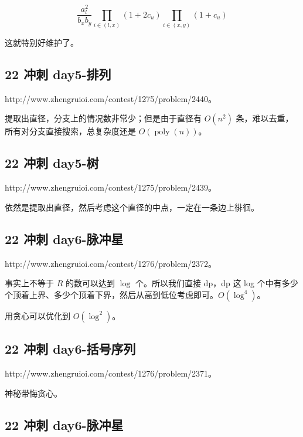 \documentclass[UTF8,12pt,a4paper]{ctexart}
\begin{document}
	$$
	\frac {a_l^2}{b_xb_y}\prod_{i\in(l,x)}(1+2c_u)\prod_{i\in(x,y)} (1+c_u)
	$$
	
	这就特别好维护了。
	
	\subsection*{22 冲刺 day5-排列}
	
	http://www.zhengruioi.com/contest/1275/problem/2440。
	
	提取出直径，分支上的情况数非常少；但是由于直径有 $O(n^2)$ 条，难以去重，所有对分支直接搜索，总复杂度还是 $O(\operatorname{poly}(n))$。
	
	\subsection*{22 冲刺 day5-树}
	
	http://www.zhengruioi.com/contest/1275/problem/2439。
	
	依然是提取出直径，然后考虑这个直径的中点，一定在一条边上徘徊。
	
	\subsection*{22 冲刺 day6-脉冲星}
	
	http://www.zhengruioi.com/contest/1276/problem/2372。
	
	事实上不等于 $R$ 的数可以达到 $\log$ 个。所以我们直接 dp，dp 这 log 个中有多少个顶着上界、多少个顶着下界，然后从高到低位考虑即可。$O(\log^4)$。
	
	用贪心可以优化到 $O(\log^2)$。
	
	\subsection*{22 冲刺 day6-括号序列}
	
	http://www.zhengruioi.com/contest/1276/problem/2371。
	
	神秘带悔贪心。
	
	\subsection*{22 冲刺 day6-脉冲星}
	
\end{document}
